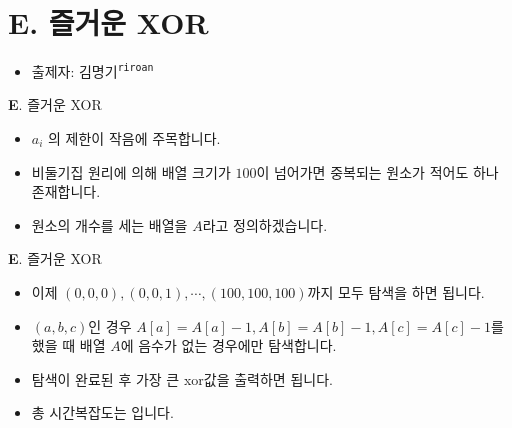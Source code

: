 \section{E. 즐거운 XOR}

\begin{frame} %
    \begin{itemize}
        \item 출제자: 김명기\textsuperscript{\color{kupc-gray}\texttt{riroan}}
    \end{itemize}
\end{frame}

\begin{frame}{\textbf{E}. 즐거운 XOR}
    \begin{itemize}
		\item $a_i$ 의 제한이 작음에 주목합니다.
		\item 비둘기집 원리에 의해 배열 크기가 $100$이 넘어가면 중복되는 원소가 적어도 하나 존재합니다.
		\item 원소의 개수를 세는 배열을 $A$라고 정의하겠습니다.
	\end{itemize}
\end{frame}

\begin{frame}{\textbf{E}. 즐거운 XOR}
	\begin{itemize}
		\item 이제 $(0,0,0), (0,0,1), \cdots , (100,100,100)$까지 모두 탐색을 하면 됩니다.
		\item $(a, b, c)$인 경우 $A[a]=A[a]-1, A[b]=A[b]-1, A[c]=A[c]-1$를 했을 때 배열 $A$에 음수가 없는 경우에만 탐색합니다.
		\item 탐색이 완료된 후 가장 큰 xor값을 출력하면 됩니다.
		\item 총 시간복잡도는 입니다.
	\end{itemize}
\end{frame}